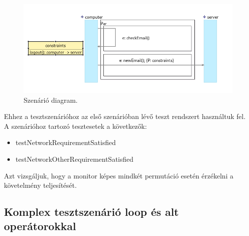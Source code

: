 \begin{figure}[!ht]
    \centering
    \includegraphics[width=150mm, keepaspectratio]{figures/diagramParExample.png}
    \caption{Szenárió diagram.}
\end{figure}

Ehhez a tesztszenárióhoz az első szenárióban lévő teszt rendszert használtuk fel.
A szenárióhoz tartozó tesztesetek a következők:

\begin{itemize}
    \item testNetworkRequirementSatisfied
    \item testNetworkOtherRequirementSatisfied
\end{itemize}

Azt vizsgáljuk, hogy a monitor képes mindkét permutáció esetén érzékelni a követelmény teljesítését.

\clearpage\subsection{Komplex tesztszenárió loop és alt operátorokkal}

